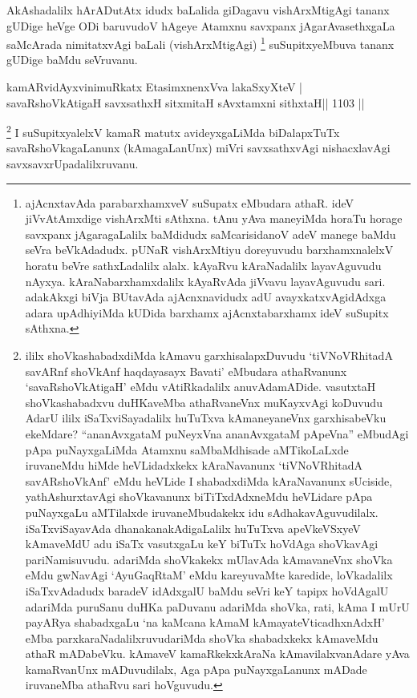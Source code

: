 \begin{artha}
AkAshadalilx hArADutAtx idudx baLalida giDagavu vishArxMtigAgi tananx gUDige heVge ODi baruvudoV hAgeye Atamxnu savxpanx jAgarAvasethxgaLa saMcArada nimitatxvAgi baLali (vishArxMtigAgi) \footnote{ajAcnxtavAda parabarxhamxveV suSupatx eMbudara athaR. ideV jiVvAtAmxdige vishArxMti sAthxna. tAnu yAva maneyiMda horaTu horage savxpanx jAgaragaLalilx baMdidudx saMcarisidanoV adeV manege baMdu seVra beVkAdadudx. pUNaR vishArxMtiyu doreyuvudu barxhamxnalelxV horatu beVre sathxLadalilx alalx. kAyaRvu kAraNadalilx layavAguvudu nAyxya. kAraNabarxhamxdalilx kAyaRvAda jiVvavu layavAguvudu sari. adakAkxgi biVja BUtavAda ajAcnxnavidudx adU avayxkatxvAgidAdxga adara upAdhiyiMda kUDida barxhamx ajAcnxtabarxhamx ideV suSupitx sAthxna.} suSupitxyeMbuva tananx gUDige baMdu seVruvanu.
\end{artha}


\begin{shl}
kamARvidAyxvinimuRkatx EtasimxnenxVva lakaSxyXteV | \\
savaRshoVkAtigaH savxsathxH sitxmitaH sAvxtamxni sithxtaH\hfill ||  1103 ||  
\end{shl}

\begin{artha}
\footnote{ililx shoVkashabadxdiMda kAmavu garxhisalapxDuvudu `tiVNoVRhitadA savARnf shoVkAnf haqdayasayx Bavati' eMbudara athaRvanunx `savaRshoVkAtigaH' eMdu vAtiRkadalilx anuvAdamADide. vasutxtaH shoVkashabadxvu duHKaveMba athaRvaneVnx muKayxvAgi koDuvudu AdarU ililx iSaTxviSayadalilx huTuTxva kAmaneyaneVnx garxhisabeVku ekeMdare? ``ananAvxgataM puNeyxVna ananAvxgataM pApeVna'' eMbudAgi pApa puNayxgaLiMda Atamxnu saMbaMdhisade aMTikoLaLxde iruvaneMdu hiMde heVLidadxkekx kAraNavanunx `tiVNoVRhitadA savARshoVkAnf' eMdu heVLide I shabadxdiMda kAraNavanunx sUciside, yathAshurxtavAgi shoVkavanunx biTiTxdAdxneMdu heVLidare pApa puNayxgaLu aMTilalxde iruvaneMbudakekx idu sAdhakavAguvudilalx. iSaTxviSayavAda dhanakanakAdigaLalilx huTuTxva apeVkeVSxyeV kAmaveMdU adu iSaTx vasutxgaLu keY biTuTx hoVdAga shoVkavAgi pariNamisuvudu. adariMda shoVkakekx mUlavAda kAmavaneVnx shoVka eMdu gwNavAgi `AyuGaqRtaM' eMdu kareyuvaMte karedide, loVkadalilx iSaTxvAdadudx baradeV idAdxgalU baMdu seVri keY tapipx hoVdAgalU adariMda puruSanu duHKa paDuvanu adariMda shoVka, rati, kAma I mUrU payARya shabadxgaLu `na kaMcana kAmaM kAmayateV\s ticadhxnAdxH' eMba parxkaraNadalilxruvudariMda shoVka shabadxkekx kAmaveMdu athaR mADabeVku. kAmaveV kamaRkekxkAraNa kAmavilalxvanAdare yAva kamaRvanUnx mADuvudilalx, Aga pApa puNayxgaLanunx mADade iruvaneMba athaRvu sari hoVguvudu.}
I suSupitxyalelxV kamaR matutx avideyxgaLiMda biDalapxTuTx savaRshoVkagaLanunx (kAmagaLanUnx) miVri savxsathxvAgi nishacxlavAgi savxsavxrUpadalilxruvanu.
\end{artha}

